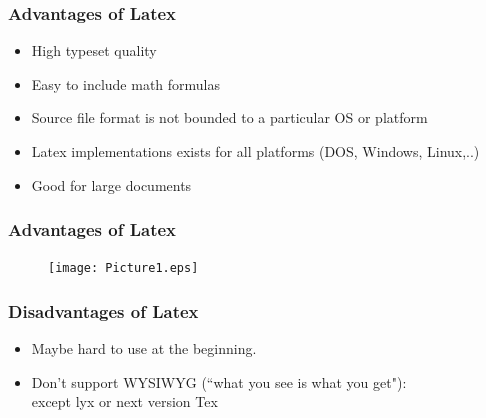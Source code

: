 \documentclass [9pt] {beamer}
\begin{document}
\begin{frame}\frametitle{Advantages of Latex}
\rm
\fontsize{9pt}{11pt}\selectfont
\begin{itemize}
\fontsize{8pt}{10pt}\selectfont
\item High typeset quality\\[.30cm]

\item Easy to include math formulas\\[.30cm]

\item Source file format is not bounded to a particular OS or platform\\[.30cm]

\item Latex implementations exists for all platforms (DOS, Windows, Linux,..)\\[.30cm]

\item Good for large documents\\[.30cm]

\end{itemize}
\end{frame}
%
%
\begin{frame}\frametitle{Advantages of Latex}
\rm
\begin{figure}[h!]
\begin{center}
     \texttt{[image: Picture1.eps]}
\end{center}
\end{figure}
\end{frame}


\begin{frame}\frametitle{Disadvantages of Latex}
\rm
\fontsize{9pt}{11pt}\selectfont
\begin{itemize}
\fontsize{8pt}{10pt}\selectfont

\item Maybe hard to use at the beginning.\\[.30cm]

\item Don't support WYSIWYG (``what you see is what you get"):\\
\textcolor[rgb]{0.98,0.00,0.00}{except lyx or next version Tex}\\[.30cm]

\end{itemize}
\end{frame}
\end{document}
